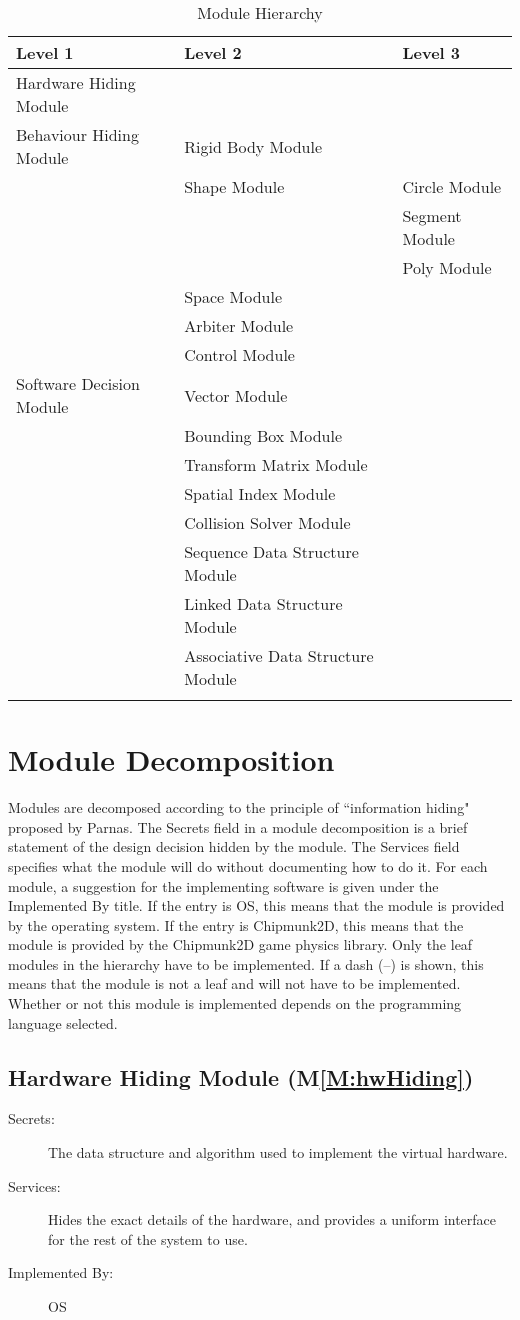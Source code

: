 \documentclass[12pt]{article}
\begin{document}
\begin{longtable}{l l l}
\toprule
Level 1 & Level 2 & Level 3
\\
\midrule
Hardware Hiding Module &  & 
\\
Behaviour Hiding Module & Rigid Body Module & 
\\
 & Shape Module & Circle Module
\\
 &  & Segment Module
\\
 &  & Poly Module
\\
 & Space Module & 
\\
 & Arbiter Module & 
\\
 & Control Module & 
\\
Software Decision Module & Vector Module & 
\\
 & Bounding Box Module & 
\\
 & Transform Matrix Module & 
\\
 & Spatial Index Module & 
\\
 & Collision Solver Module & 
\\
 & Sequence Data Structure Module & 
\\
 & Linked Data Structure Module & 
\\
 & Associative Data Structure Module & 
\\
\bottomrule
\caption{Module Hierarchy}
\label{Table:ModuHier}
\end{longtable}
\section{Module Decomposition}
\label{Sec:ModuDeco}
Modules are decomposed according to the principle of ``information hiding" proposed by Parnas. The Secrets field in a module decomposition is a brief statement of the design decision hidden by the module. The Services field specifies what the module will do without documenting how to do it. For each module, a suggestion for the implementing software is given under the Implemented By title. If the entry is OS, this means that the module is provided by the operating system. If the entry is Chipmunk2D, this means that the module is provided by the Chipmunk2D game physics library. Only the leaf modules in the hierarchy have to be implemented. If a dash (--) is shown, this means that the module is not a leaf and will not have to be implemented. Whether or not this module is implemented depends on the programming language selected.
\subsection{Hardware Hiding Module (M\ref{M:hwHiding})}
\label{Sec:HardHidiModu()}
\begin{description}
\item[Secrets:]The data structure and algorithm used to implement the virtual hardware.
\item[Services:]Hides the exact details of the hardware, and provides a uniform interface for the rest of the system to use.
\item[Implemented By:]OS
\end{description}
\end{document}
